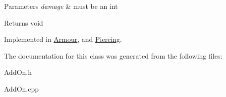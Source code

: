 \begin{DoxyParams}{Parameters}
{\em damage} & must be an int \\
\hline
\end{DoxyParams}
\begin{DoxyReturn}{Returns}
void 
\end{DoxyReturn}


Implemented in \hyperlink{classArmour_a7a52bd8473173c81a4ba8a6373513581}{Armour}, and \hyperlink{classPiercing_a103634469a43e1662bd5e07e66901667}{Piercing}.



The documentation for this class was generated from the following files\+:\begin{DoxyCompactItemize}
\item 
Add\+On.\+h\item 
Add\+On.\+cpp\end{DoxyCompactItemize}
